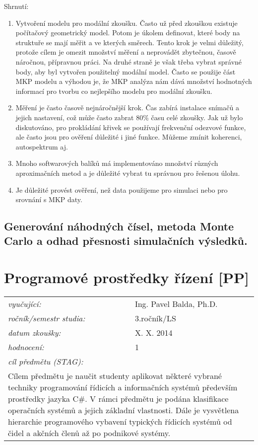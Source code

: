 Shrnutí:
\begin{enumerate}
\item Vytvoření modelu pro modální zkoušku. Často už před zkouškou existuje počítačový geometrický model. Potom je úkolem definovat, které body na struktuře se mají měřit a ve kterých směrech. Tento krok je velmi důležitý, protože cílem je omezit množství měření a neprovádět zbytečnou, časově náročnou, přípravnou práci. Na druhé straně je však třeba vybrat správné body, aby byl vytvořen použitelný modální model. Často se použije část MKP modelu a výhodou je, že MKP analýza nám dává množství hodnotných informací pro tvorbu co nejlepšího modelu pro modální zkoušku.
\item Měření je často časově nejnáročnější krok. Čas zabírá instalace snímačů a jejich nastavení, což může často zabrat 80\% času celé zkoušky. Jak už bylo diskutováno, pro
prokládání křivek se používají frekvenční odezvové funkce, ale často jsou pro ověření důležité i jiné funkce. Můžeme zmínit koherenci, autospektrum aj.
\item Mnoho softwarových balíků má implementováno množství různých aproximačních metod a je důležité vybrat tu správnou pro řešenou úlohu.
\item Je důležité provést ověření, než data použijeme pro simulaci nebo pro srovnání s MKP daty.
\end{enumerate}

\subsection{Generování náhodných čísel, metoda Monte Carlo a odhad přesnosti simulačních výsledků.}

\newpage
\section{Programové prostředky řízení [PP]}

\begin{table}[H]
\centering
\begin{tabular}{p{4cm} p{12cm}}
\textit{vyučující:}             & Ing. Pavel Balda, Ph.D. \\
\textit{ročník/semestr studia:} & 3.ročník/LS \\
\textit{datum zkoušky:}         & X. X. 2014 \\
\textit{hodnocení:}             & 1 \\
\textit{cíl předmětu (STAG):}   & \\
\multicolumn{2}{p{16cm}}{Cílem předmětu je naučit studenty aplikovat některé vybrané techniky programování řídicích a informačních systémů především prostředky jazyka C\#. V rámci předmětu je podána klasifikace operačních systémů a jejich základní vlastnosti. Dále je vysvětlena hierarchie programového vybavení typických řídicích systémů od čidel a akčních členů až po podnikové systémy.}
\end{tabular}
\end{table}

